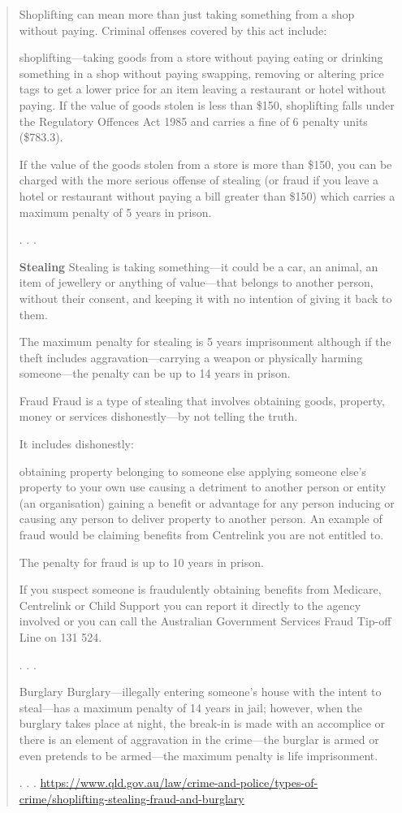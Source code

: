 \documentclass[11pt]{article}
\begin{document}
\begin{quote}
Shoplifting can mean more than just taking something from a shop without paying. Criminal offenses covered by this act include:

shoplifting—taking goods from a store without paying
eating or drinking something in a shop without paying
swapping, removing or altering price tags to get a lower price for an item
leaving a restaurant or hotel without paying.
If the value of goods stolen is less than \$150, shoplifting falls under the Regulatory Offences Act 1985 and carries a fine of 6 penalty units (\$783.3).

If the value of the goods stolen from a store is more than \$150, you can be charged with the more serious offense of stealing (or fraud if you leave a hotel or restaurant without paying a bill greater than \$150) which carries a maximum penalty of 5 years in prison.

. . . 

\textbf{Stealing} \newline
Stealing is taking something—it could be a car, an animal, an item of jewellery or anything of value—that belongs to another person, without their consent, and keeping it with no intention of giving it back to them.

The maximum penalty for stealing is 5 years imprisonment although if the theft includes aggravation—carrying a weapon or physically harming someone—the penalty can be up to 14 years in prison.

Fraud
Fraud is a type of stealing that involves obtaining goods, property, money or services dishonestly—by not telling the truth.

It includes dishonestly:

obtaining property belonging to someone else
applying someone else's property to your own use
causing a detriment to another person or entity (an organisation)
gaining a benefit or advantage for any person
inducing or causing any person to deliver property to another person.
An example of fraud would be claiming benefits from Centrelink you are not entitled to.

The penalty for fraud is up to 10 years in prison.

If you suspect someone is fraudulently obtaining benefits from Medicare, Centrelink or Child Support you can report it directly to the agency involved or you can call the Australian Government Services Fraud Tip-off Line on 131 524.

. . .

Burglary
Burglary—illegally entering someone’s house with the intent to steal—has a maximum penalty of 14 years in jail; however, when the burglary takes place at night, the break-in is made with an accomplice or there is an element of aggravation in the crime—the burglar is armed or even pretends to be armed—the maximum penalty is life imprisonment.

. . .
\url{https://www.qld.gov.au/law/crime-and-police/types-of-crime/shoplifting-stealing-fraud-and-burglary}
\end{quote}
\end{document}
